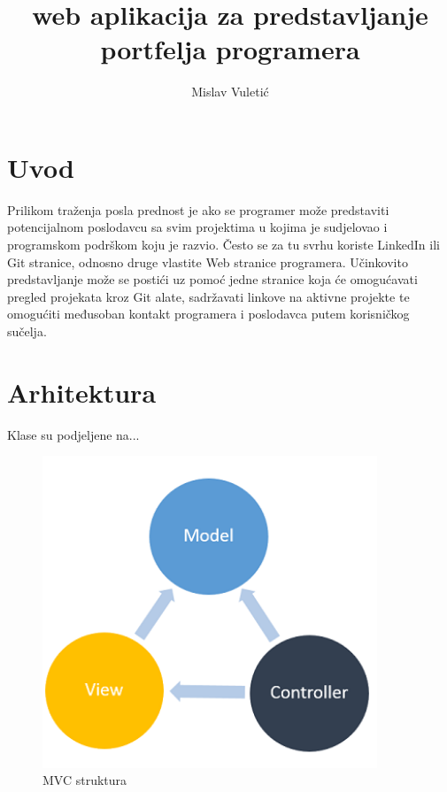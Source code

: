 \documentclass[times, utf8, zavrsni]{fer}
\begin{document}

\title{web aplikacija za predstavljanje portfelja programera}

\author{Mislav Vuletić}

\maketitle


\zahvala{}

\tableofcontents

\chapter{Uvod}
\qquad Prilikom traženja posla prednost je ako se programer može predstaviti potencijalnom poslodavcu sa svim projektima u kojima je sudjelovao i programskom podrškom koju je razvio.
Često se za tu svrhu koriste LinkedIn ili Git stranice, odnosno druge vlastite Web stranice programera.
Učinkovito predstavljanje može se postići uz pomoć jedne stranice koja će omogućavati pregled projekata kroz Git alate, sadržavati linkove na aktivne projekte te omogućiti međusoban kontakt programera i poslodavca putem korisničkog sučelja.

\chapter{Arhitektura}
Klase su podjeljene na...

\begin{figure}[htb]\centering
				\includegraphics[width=10cm]{images/mvc.png}
				\caption{MVC struktura}
				\label{fig:mvc}
\end{figure}
\end{document}
